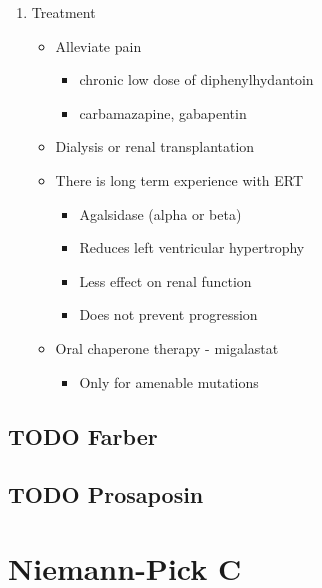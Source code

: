\documentclass{scrartcl}
\begin{document}
\begin{enumerate}
\item Treatment
\label{sec:org85b1f3e}
\begin{itemize}
\item Alleviate pain
\begin{itemize}
\item chronic low dose of diphenylhydantoin
\item carbamazapine, gabapentin
\end{itemize}
\item Dialysis or renal transplantation
\item There is long term experience with ERT
\begin{itemize}
\item Agalsidase (alpha or beta)
\item Reduces left ventricular hypertrophy
\item Less effect on renal function
\item Does not prevent progression
\end{itemize}
\item Oral chaperone therapy - migalastat
\begin{itemize}
\item Only for amenable mutations
\end{itemize}
\end{itemize}
\end{enumerate}

\subsection{{\bfseries\sffamily TODO} Farber}
\label{sec:orgb1f516c}

\subsection{{\bfseries\sffamily TODO} Prosaposin}
\label{sec:orgfe9f635}


\section{Niemann-Pick C}
\label{sec:orgb184dc5}
\end{document}
